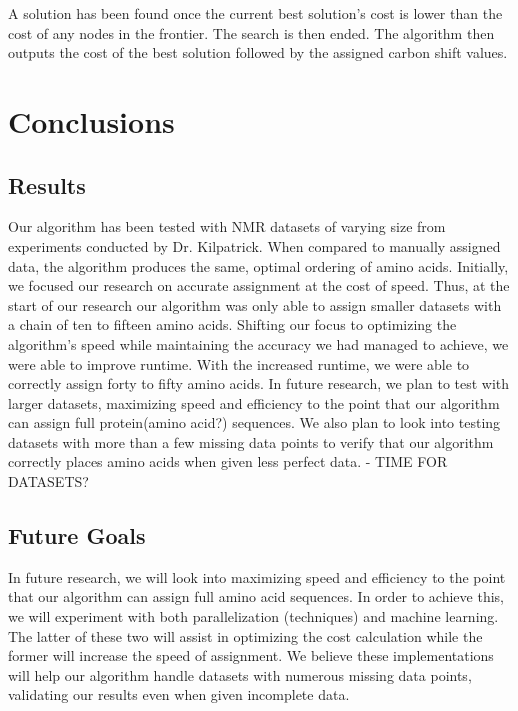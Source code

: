\documentclass[12pt]{article}
\begin{document}
A solution has been found once the current best solution's cost is lower than the cost of any nodes in the frontier. The search is then ended. The algorithm then outputs the cost of the best solution followed by the assigned carbon shift values. 

\section{Conclusions}
\label{sec:conclusions}

\subsection{Results}
\label{sub:results}
Our algorithm has been tested with NMR datasets of varying size from experiments conducted by Dr. Kilpatrick.  When compared to manually assigned data, the algorithm produces the same, optimal ordering of amino acids. Initially, we focused our research on accurate assignment at the cost of speed. Thus, at the start of our research our algorithm was only able to assign smaller datasets with a chain of ten to fifteen amino acids. Shifting our focus to optimizing the algorithm's speed while maintaining the accuracy we had managed to achieve, we were able to improve runtime. With the increased runtime, we were able to correctly assign forty to fifty amino acids. In future research, we plan to test with larger datasets, maximizing speed and efficiency to the point that our algorithm can assign full protein(amino acid?) sequences. We also plan to look into testing datasets with more than a few missing data points to verify that our algorithm correctly places amino acids when given less perfect data.  - TIME FOR DATASETS?

\subsection{Future Goals} %
\label{sub:future_goals}
In future research, we will look into maximizing speed and efficiency to the point that our algorithm can assign full amino acid sequences. In order to achieve this, we will experiment with  both parallelization (techniques) and machine learning. The latter of these two will assist in optimizing the cost calculation while the former will increase the speed of assignment. We believe these implementations will help our algorithm handle datasets with numerous missing data points, validating our results even when given incomplete data. 



\end{document}
